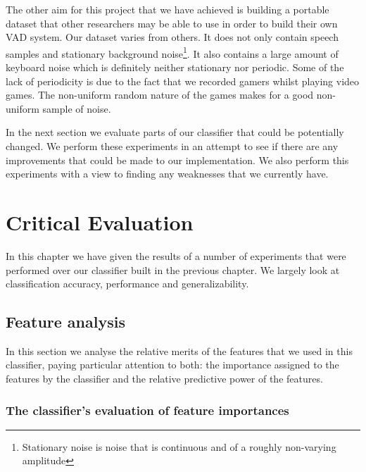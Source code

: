 \documentclass[ %
                    author={Sam Phippen},
                supervisor={Dr. Rafal Bogacz},
                     title={Real time voice activity detectors in noisy personal computing environments},
                  subtitle={},
                    degree={MEng},
                      year={2012} ]{thesis}
\begin{document}
The other aim for this project that we have achieved is building a portable
dataset that other researchers may be able to use in order to build their own
VAD system. Our dataset varies from others. It does not only contain speech
samples and stationary background noise\footnote{Stationary noise is noise that
is continuous and of a roughly non-varying amplitude}. It also contains a large
amount of keyboard noise which is definitely neither stationary nor periodic.
Some of the lack of periodicity is due to the fact that we recorded gamers
whilst playing video games. The non-uniform random nature of the games makes
for a good non-uniform sample of noise.

In the next section we evaluate parts of our classifier that could be
potentially changed. We perform these experiments in an attempt to see if there
are any improvements that could be made to our implementation. We also perform
this experiments with a view to finding any weaknesses that we currently have.


\chapter{Critical Evaluation}
\label{chap:evaluation}

\vspace{1cm}

In this chapter we have given the results of a number of experiments that were
performed over our classifier built in the previous chapter. We largely look at
classification accuracy, performance and generalizability.

\section{Feature analysis}

In this section we analyse the relative merits of the features that we used in
this classifier, paying particular attention to both: the importance assigned
to the features by the classifier and the relative predictive power of the
features.

\subsection{The classifier's evaluation of feature importances}
\end{document}
